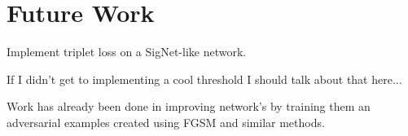 \section{Future Work}\label{sec:future_work}
Implement triplet loss on a SigNet-like network.

If I didn't get to implementing a cool threshold I should talk about that here...

Work has already been done in improving network's by training them an adversarial examples created using FGSM and similar methods.
